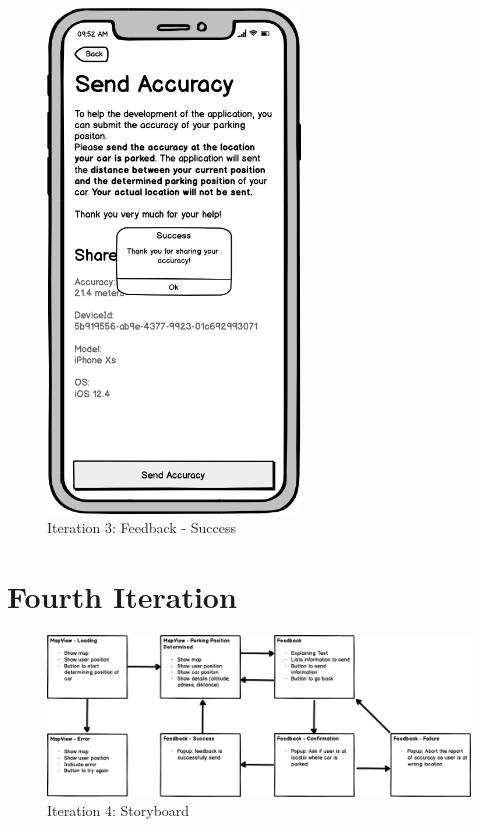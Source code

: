 \begin{figure}[H]
  \centering
  \begin{minipage}[b]{0.45\textwidth}
    \centering
    \includegraphics[width=0.6\textwidth]{images/UI/Iteration3-Feedback-Success.png}
    \caption{Iteration 3: Feedback - Success}
    \label{fig:i3-feedback-succ}
  \end{minipage}
  \hfill
  \begin{minipage}[b]{0.45\textwidth}
    
  \end{minipage}
\end{figure}

\section{Fourth Iteration}

\begin{figure}[H]
    \centering
    \includegraphics[width=\textwidth]{images/UI/Iteration4-Overview.png}
    \caption{Iteration 4: Storyboard}
    \label{fig:i4story}
\end{figure}

